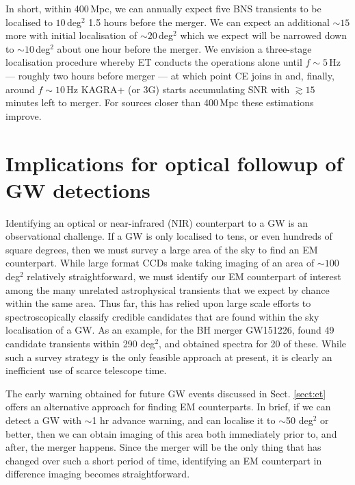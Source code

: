 \documentclass{aa}
\begin{document}
In short, within 400\,Mpc, we can annually expect five BNS transients to be localised to $10\,$deg$^2$ 1.5 hours
before the merger. We can expect an additional $\sim 15$ more with initial localisation of $\sim 20\,$deg$^2$ 
which we expect will be narrowed down to $\sim10\,$deg$^2 $ about one hour before the merger.
We envision a three-stage localisation procedure whereby ET conducts the operations alone until $f\sim 5\,$Hz 
--- roughly two hours before merger --- at which point CE joins in and, finally, around $f\sim 10\,$Hz KAGRA+ (or 3G) starts accumulating SNR with $\gtrsim 15\,$ minutes left to merger.
For sources closer than 400\,Mpc these estimations improve.



\section{Implications for optical followup of GW detections} \label{sect:EM}
Identifying an optical or near-infrared (NIR) counterpart to a GW is an observational challenge. If a GW is only localised to tens, or even hundreds of square degrees, then we must survey a large area of the sky to find an EM counterpart. While large format CCDs make taking imaging of an area of $\sim 100\,$ deg$^2$ relatively straightforward, we must identify our EM counterpart of interest among the many unrelated astrophysical transients that we expect by chance within the same area. Thus far, this has relied upon large scale efforts to spectroscopically classify credible candidates that are found within the sky localisation of a GW. As an example, for the BH merger GW151226, \cite{Smar16} found 49 candidate transients within 290 deg$^2$, and obtained spectra for 20 of these. While such a survey strategy is the only feasible approach at present, it is clearly an inefficient use of scarce telescope time.

The early warning obtained for future GW events discussed in Sect. \ref{sect:et} offers an alternative approach for finding EM counterparts. In brief, if we can detect a GW with $\sim$1 hr advance warning, and can localise it to $\sim$50 deg$^2$ or better, then we can obtain imaging of this area both immediately prior to, and after, the merger happens. Since the merger will be the only thing that has changed over such a short period of time, identifying an EM counterpart in difference imaging becomes straightforward.
\end{document}

